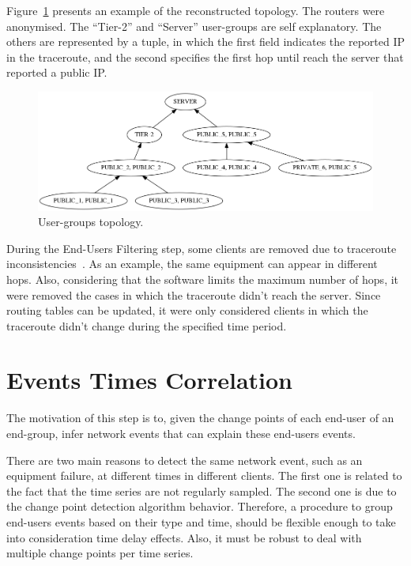 Figure~\ref{fig:real_graph} presents an example of the reconstructed
topology. The routers were anonymised. The ``Tier-2'' and ``Server''
user-groups are self explanatory. The others are represented by a tuple, in
which the first field indicates the reported IP in the traceroute, and the
second specifies the first hop until reach the server that reported a public
IP\@.

\begin{figure}[H]
    \centering
    \includegraphics[width=\linewidth]{./figures/methodology/spatial_correlation/dtstart2016-05-01_dtend2016-05-11_NRIDTCLDM031_graph_anonymized.png}
    \caption{User-groups topology.}
\label{fig:real_graph}
\end{figure}%

During the End-Users Filtering step, some clients are removed due to traceroute
inconsistencies~\cite{avoiding_traceroute_anomalies_with_paris_traceroute}.
As an example, the same equipment can appear in different hops. Also,
considering that the software limits the maximum number of hops, it were
removed the cases in which the traceroute didn't reach the server.
Since routing tables can be updated, it were only considered clients
in which the traceroute didn't change during the specified time period.

\section{Events Times Correlation}
\label{sec:events_times_correlation}

The motivation of this step is to, given the change points of each end-user of
an end-group, infer network events that can explain these end-users events.

There are two main reasons to detect the same network event, such as an
equipment failure, at different times in different clients. The first one is
related to the fact that the time series are not regularly sampled. The second
one is due to the change point detection algorithm behavior.
Therefore, a procedure to group end-users events based on their type and time,
should be flexible enough to take into consideration time delay effects. Also,
it must be robust to deal with multiple change points per time series.

